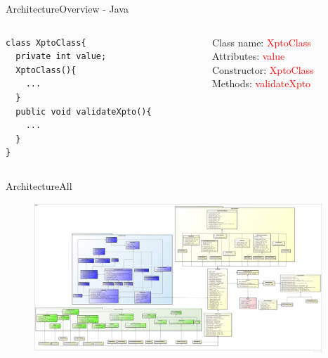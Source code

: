 \documentclass[10pt]{beamer}
\begin{document}
\begin{frame}[fragile]{Architecture}{Overview - Java}
  \begin{columns}
    \begin{column}{0.6\textwidth}
      \small
\begin{lstlisting}
class XptoClass{
  private int value;
  XptoClass(){
    ...
  }
  public void validateXpto(){
    ...
  }
}
\end{lstlisting}
    \end{column}

    \begin{column}{0.4\textwidth}
      Class name: \textcolor{red}{XptoClass}\\ \pause
      Attributes: \textcolor{red}{value}\\ \pause
      Constructor: \textcolor{red}{XptoClass}\\ \pause
      Methods: \textcolor{red}{validateXpto}\\
    \end{column}

  \end{columns}
\end{frame}

\begin{frame}{Architecture}{All}
  \begin{figure}[all]
    \includegraphics[width=0.97\textwidth]{images/OverviewClasses.png}
  \end{figure}
\end{frame}
\end{document}

